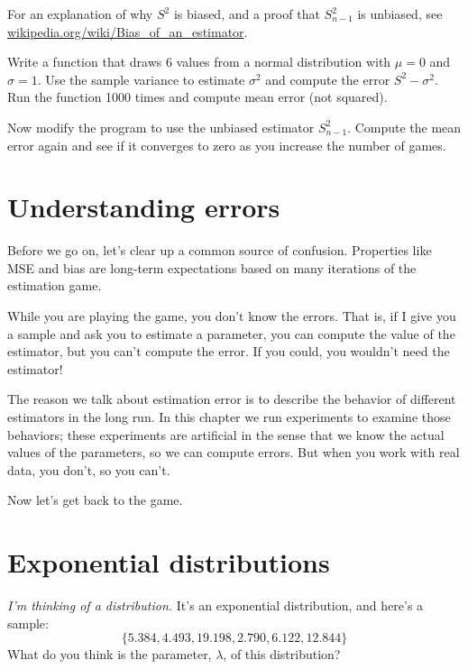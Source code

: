 \documentclass[12pt]{book}
\begin{document}
For an explanation of why $S^2$ is biased, and a proof that
$S_{n-1}^2$ is unbiased, see
\url{wikipedia.org/wiki/Bias_of_an_estimator}.

\begin{ex}


Write a function that draws 6 values from a normal distribution with
$\mu=0$ and $\sigma=1$.  Use the sample variance to estimate
$\sigma^2$ and compute the error $S^2 - \sigma^2$.  Run the function 1000
times and compute mean error (not squared).

Now modify the program to use the unbiased estimator $S_{n-1}^2$.
Compute the mean error again and see if it converges to zero as you
increase the number of games.

\end{ex}


\section{Understanding errors}

Before we go on, let's clear up a common source of confusion.
Properties like MSE and bias are long-term expectations based on
many iterations of the estimation game.

While you are playing the game, you don't know the errors.  That is,
if I give you a sample and ask you to estimate a parameter, you
can compute the value of the estimator, but you can't compute the
error.  If you could, you wouldn't need the estimator!

The reason we talk about estimation error is to describe the behavior
of different estimators in the long run.  In this chapter we run
experiments to examine those behaviors; these experiments are
artificial in the sense that we know the actual values of the
parameters, so we can compute errors.  But when you work with
real data, you don't, so you can't.

Now let's get back to the game.


\section{Exponential distributions}

{\em I'm thinking of a distribution.}  It's an exponential distribution, and 
here's a sample:
%
\[ \{ 5.384, 4.493, 19.198, 2.790, 6.122, 12.844 \} \]
%
What do you think is the parameter, $\lambda$, of this distribution?
\end{document}
